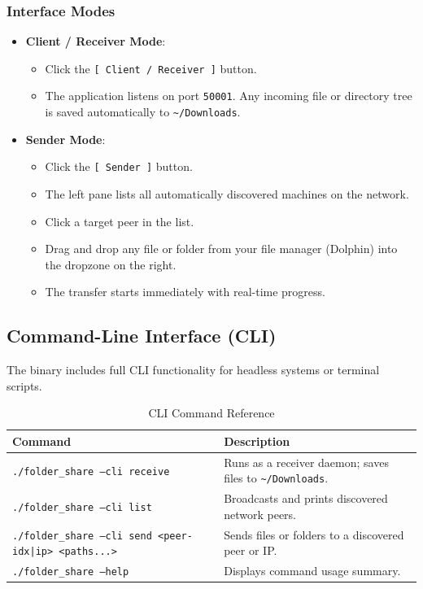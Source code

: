 \documentclass[11pt,a4paper]{article}
\begin{document}
\subsubsection{Interface Modes}
\begin{itemize}
    \item \textbf{Client / Receiver Mode}: 
    \begin{itemize}
        \item Click the \texttt{[ Client / Receiver ]} button.
        \item The application listens on port \texttt{50001}. Any incoming file or directory tree is saved automatically to \texttt{\textasciitilde/Downloads}.
    \end{itemize}
    \item \textbf{Sender Mode}:
    \begin{itemize}
        \item Click the \texttt{[ Sender ]} button.
        \item The left pane lists all automatically discovered machines on the network.
        \item Click a target peer in the list.
        \item Drag and drop any file or folder from your file manager (Dolphin) into the dropzone on the right.
        \item The transfer starts immediately with real-time progress.
    \end{itemize}
\end{itemize}

\subsection{Command-Line Interface (CLI)}

The binary includes full CLI functionality for headless systems or terminal scripts.

\begin{table}[h!]
\centering
\small
\begin{tabular}{@{}ll@{}}
\toprule
\textbf{Command} & \textbf{Description} \\ \midrule
\texttt{./folder\_share --cli receive} & Runs as a receiver daemon; saves files to \texttt{\textasciitilde/Downloads}. \\
\texttt{./folder\_share --cli list} & Broadcasts and prints discovered network peers. \\
\texttt{./folder\_share --cli send <peer-idx|ip> <paths...>} & Sends files or folders to a discovered peer or IP. \\
\texttt{./folder\_share --help} & Displays command usage summary. \\ \bottomrule
\end{tabular}
\caption{CLI Command Reference}
\end{table}
\end{document}
